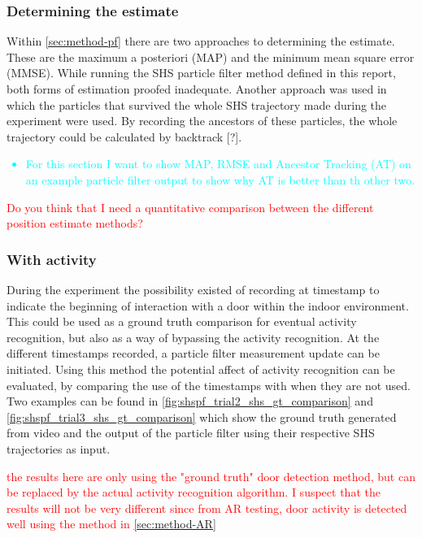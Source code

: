 \subsubsection{Determining the estimate}
Within \cref{sec:method-pf} there are two approaches to determining the estimate. These are the maximum a posteriori (MAP) and the minimum mean square error (MMSE). While running the SHS particle filter method defined in this report, both forms of estimation proofed inadequate. Another approach was used in which the particles that survived the whole SHS trajectory made during the experiment were used. By recording the ancestors of these particles, the whole trajectory could be calculated by backtrack [\qn ?].

\textcolor{cyan}{
\begin{itemize}
	\item For this section I want to show MAP, RMSE and Ancestor Tracking (AT) on an example particle filter output to show why AT is better than th other two.
\end{itemize}}

\textcolor{red}{Do you think that I need a quantitative comparison between the different position estimate methods?}

\subsubsection{With activity}
During the experiment the possibility existed of recording at timestamp to indicate the beginning of interaction with a door within the indoor environment. This could be used as a ground truth comparison for eventual activity recognition, but also as a way of bypassing the activity recognition. At the different timestamps recorded, a particle filter measurement update can be initiated. Using this method the potential affect of activity recognition can be evaluated, by comparing the use of the timestamps with when they are not used. Two examples can be found in \cref{fig:shspf_trial2_shs_gt_comparison} and \cref{fig:shspf_trial3_shs_gt_comparison} which show the ground truth generated from video and the output of the particle filter using their respective SHS trajectories as input.

\textcolor{red}{the results here are only using the "ground truth" door detection method, but can be replaced by the actual activity recognition algorithm. I suspect that the results will not be very different since from AR testing, door activity is detected well using the method in \cref{sec:method-AR}}

